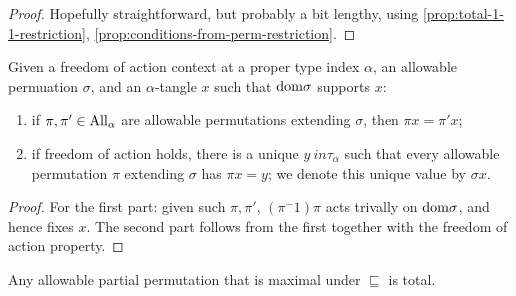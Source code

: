 \begin{proof}
  Hopefully straightforward, but probably a bit lengthy, using \cref{prop:total-1-1-restriction}, \cref{prop:conditions-from-perm-restriction}.
\end{proof}

\begin{proposition}
  \label{prop:allowable-partial-perm-action}
  Given a freedom of action context at a proper type index $\alpha$, an allowable permuation $\sigma$, and an $\alpha$-tangle $x$ such that $\mathrm{dom} \sigma$ supports $x$:
  \begin{enumerate}
    \item if $\pi, \pi' \in \mathrm{All}_\alpha$ are allowable permutations extending $\sigma$, then $\pi x = \pi' x$;
    \item if freedom of action holds, there is a unique $y \ in \tau_\alpha$ such that every allowable permutation $\pi$ extending $\sigma$ has $\pi x = y$; we denote this unique value by $\sigma x$.
  \end{enumerate}
\end{proposition}

\begin{proof}
  For the first part: given such $\pi, \pi'$, $(\pi^-1)\pi$ acts trivally on $\mathrm{dom} \sigma$, and hence fixes $x$.  The second part follows from the first together with the freedom of action property.
\end{proof}

\begin{lemma}
  \label{lem:maximal-allowable-partial-perm-total}
  Any allowable partial permutation that is maximal under $\sqsubseteq$ is total.
\end{lemma}

